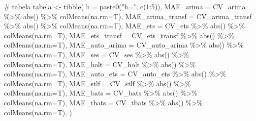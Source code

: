 \documentclass[
  letterpaper,
  DIV=11,
  numbers=noendperiod]{scrartcl}
\newenvironment{Shaded}{\begin{snugshade}}{\end{snugshade}}
\newcommand{\AttributeTok}[1]{\textcolor[rgb]{0.40,0.45,0.13}{#1}}
\newcommand{\CommentTok}[1]{\textcolor[rgb]{0.37,0.37,0.37}{#1}}
\newcommand{\DecValTok}[1]{\textcolor[rgb]{0.68,0.00,0.00}{#1}}
\newcommand{\FunctionTok}[1]{\textcolor[rgb]{0.28,0.35,0.67}{#1}}
\newcommand{\NormalTok}[1]{\textcolor[rgb]{0.00,0.23,0.31}{#1}}
\newcommand{\OtherTok}[1]{\textcolor[rgb]{0.00,0.23,0.31}{#1}}
\newcommand{\SpecialCharTok}[1]{\textcolor[rgb]{0.37,0.37,0.37}{#1}}
\newcommand{\StringTok}[1]{\textcolor[rgb]{0.13,0.47,0.30}{#1}}
\begin{document}
\begin{Shaded}
\begin{Highlighting}[]
\CommentTok{\# tabela}
\NormalTok{tabela }\OtherTok{\textless{}{-}} \FunctionTok{tibble}\NormalTok{(}
  \AttributeTok{h =} \FunctionTok{paste0}\NormalTok{(}\StringTok{"h="}\NormalTok{, }\FunctionTok{c}\NormalTok{(}\DecValTok{1}\SpecialCharTok{:}\DecValTok{5}\NormalTok{)),}
  \AttributeTok{MAE\_arima =}\NormalTok{ CV\_arima }\SpecialCharTok{\%\textgreater{}\%} \FunctionTok{abs}\NormalTok{() }\SpecialCharTok{\%\textgreater{}\%} \FunctionTok{colMeans}\NormalTok{(}\AttributeTok{na.rm=}\NormalTok{T),}
  \AttributeTok{MAE\_arima\_transf =}\NormalTok{  CV\_arima\_transf }\SpecialCharTok{\%\textgreater{}\%} \FunctionTok{abs}\NormalTok{() }\SpecialCharTok{\%\textgreater{}\%} \FunctionTok{colMeans}\NormalTok{(}\AttributeTok{na.rm=}\NormalTok{T),}
  \AttributeTok{MAE\_ets =}\NormalTok{  CV\_ets }\SpecialCharTok{\%\textgreater{}\%} \FunctionTok{abs}\NormalTok{() }\SpecialCharTok{\%\textgreater{}\%} \FunctionTok{colMeans}\NormalTok{(}\AttributeTok{na.rm=}\NormalTok{T),}
  \AttributeTok{MAE\_ets\_transf =}\NormalTok{  CV\_ets\_transf }\SpecialCharTok{\%\textgreater{}\%} \FunctionTok{abs}\NormalTok{() }\SpecialCharTok{\%\textgreater{}\%} \FunctionTok{colMeans}\NormalTok{(}\AttributeTok{na.rm=}\NormalTok{T),}
  \AttributeTok{MAE\_auto\_arima =}\NormalTok{ CV\_auto\_arima }\SpecialCharTok{\%\textgreater{}\%} \FunctionTok{abs}\NormalTok{() }\SpecialCharTok{\%\textgreater{}\%} \FunctionTok{colMeans}\NormalTok{(}\AttributeTok{na.rm=}\NormalTok{T),}
  \AttributeTok{MAE\_ses =}\NormalTok{ CV\_ses }\SpecialCharTok{\%\textgreater{}\%} \FunctionTok{abs}\NormalTok{() }\SpecialCharTok{\%\textgreater{}\%} \FunctionTok{colMeans}\NormalTok{(}\AttributeTok{na.rm=}\NormalTok{T),}
  \AttributeTok{MAE\_holt =}\NormalTok{ CV\_holt }\SpecialCharTok{\%\textgreater{}\%} \FunctionTok{abs}\NormalTok{() }\SpecialCharTok{\%\textgreater{}\%} \FunctionTok{colMeans}\NormalTok{(}\AttributeTok{na.rm=}\NormalTok{T),}
  \AttributeTok{MAE\_auto\_ets =}\NormalTok{ CV\_auto\_ets }\SpecialCharTok{\%\textgreater{}\%} \FunctionTok{abs}\NormalTok{() }\SpecialCharTok{\%\textgreater{}\%} \FunctionTok{colMeans}\NormalTok{(}\AttributeTok{na.rm=}\NormalTok{T),}
  \AttributeTok{MAE\_stlf =}\NormalTok{ CV\_stlf }\SpecialCharTok{\%\textgreater{}\%} \FunctionTok{abs}\NormalTok{() }\SpecialCharTok{\%\textgreater{}\%} \FunctionTok{colMeans}\NormalTok{(}\AttributeTok{na.rm=}\NormalTok{T),}
  \AttributeTok{MAE\_bats =}\NormalTok{ CV\_bats }\SpecialCharTok{\%\textgreater{}\%} \FunctionTok{abs}\NormalTok{() }\SpecialCharTok{\%\textgreater{}\%} \FunctionTok{colMeans}\NormalTok{(}\AttributeTok{na.rm=}\NormalTok{T),}
  \AttributeTok{MAE\_tbats =}\NormalTok{ CV\_tbats }\SpecialCharTok{\%\textgreater{}\%} \FunctionTok{abs}\NormalTok{() }\SpecialCharTok{\%\textgreater{}\%} \FunctionTok{colMeans}\NormalTok{(}\AttributeTok{na.rm=}\NormalTok{T),}
\NormalTok{)}


\end{Highlighting}
\end{Shaded}
\end{document}
